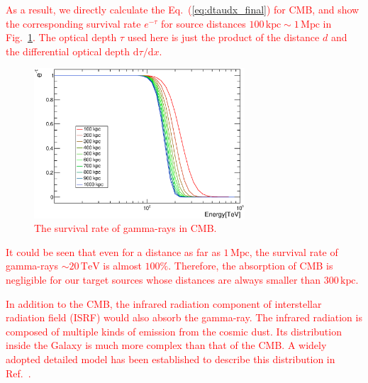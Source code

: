 \documentclass[12pt,aps,prd,amsmath,amssymb,showpacs,floats,floatfix,nofootinbib]{revtex4-1}
\def\red#1{{\textcolor{red}{#1}}} %
\def\TeV{\mathrm{TeV}} %
\def\kpc{\mathrm{kpc}} %
\def\Mpc{\mathrm{Mpc}} %
\begin{document}
\red{
As a result, we directly calculate the Eq.~(\ref{eq:dtaudx_final}) for CMB, and show the corresponding survival rate $e^{-\tau}$ for source distances $100\,\kpc\sim1\,\Mpc$ in Fig.~\ref{fig:opacity}.
The optical depth $\tau$ used here is just the product of the distance $d$ and the differential optical depth $\mathrm{d}\tau/\mathrm{d}x$.
\begin{figure}[!htpb]
  \centering
  \includegraphics[width=0.7\textwidth]{figs/opacity.eps}
  \caption{The survival rate of gamma-rays in CMB.}
  \label{fig:opacity}
\end{figure}
It could be seen that even for a distance as far as $1\,\Mpc$, the survival rate of gamma-rays $\sim20\,\TeV$ is almost $100\%$.
Therefore, the absorption of CMB is negligible for our target sources whose distances are always smaller than $300\,\kpc$.
%  
}

\red{
  In addition to the CMB, the infrared radiation component of interstellar radiation field (ISRF) would also absorb the gamma-ray.
  The infrared radiation is composed of multiple kinds of emission from the cosmic dust.
  Its distribution inside the Galaxy is much more complex than that of the CMB.
  A widely adopted detailed model has been established to describe this distribution in Ref.~\cite{Strong:1998fr}.
}
\end{document}
